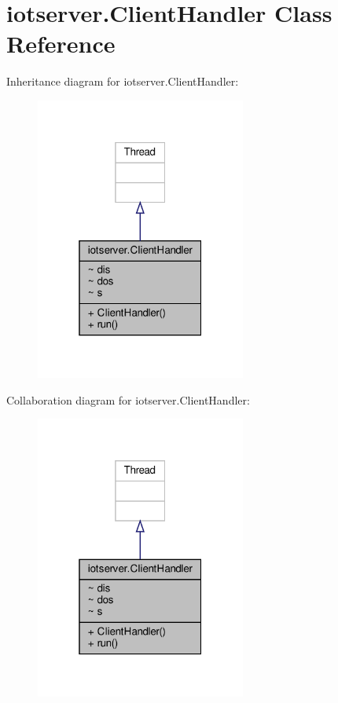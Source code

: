 \hypertarget{classiotserver_1_1ClientHandler}{}\section{iotserver.\+Client\+Handler Class Reference}
\label{classiotserver_1_1ClientHandler}


Inheritance diagram for iotserver.\+Client\+Handler\+:\nopagebreak
\begin{figure}[H]
\begin{center}
\leavevmode
\includegraphics[width=196pt]{classiotserver_1_1ClientHandler__inherit__graph}
\end{center}
\end{figure}


Collaboration diagram for iotserver.\+Client\+Handler\+:\nopagebreak
\begin{figure}[H]
\begin{center}
\leavevmode
\includegraphics[width=196pt]{classiotserver_1_1ClientHandler__coll__graph}
\end{center}
\end{figure}
